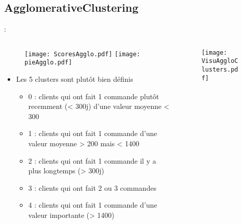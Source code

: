 \documentclass[8pt,aspectratio=169,hyperref={unicode=true}]{beamer}
\begin{document}
\subsection{AgglomerativeClustering}
\begin{frame}{\insertsection: \insertsubsection}
    \begin{columns}
        \begin{column}{.55\textwidth}
            \begin{figure}
                \texttt{[image: ScoresAgglo.pdf]}
                \texttt{[image: pieAgglo.pdf]}
            \end{figure}
            \begin{itemize}
                \footnotesize
                \item Les 5 clusters sont plutôt bien définis
                      \begin{itemize}
                          \scriptsize
                          \item 0 : clients qui ont fait 1 commande plutôt recemment (< 300j) d'une valeur moyenne < 300
                          \item 1 : clients qui ont fait 1 commande d'une valeur moyenne > 200 mais < 1400
                          \item 2 : clients qui ont fait 1 commande il y a plus longtemps (> 300j)
                          \item 3 : clients qui ont fait 2 ou 3 commandes
                          \item 4 : clients qui ont fait 1 commande d'une valeur importante (> 1400)
                      \end{itemize}
            \end{itemize}
        \end{column}
        \begin{column}{.45\textwidth}
            \begin{figure}
                \texttt{[image: VisuAggloClusters.pdf]}
            \end{figure}
        \end{column}
    \end{columns}
\end{frame}
\end{document}
